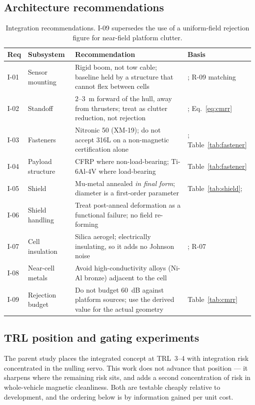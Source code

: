 \documentclass[11pt]{article}
\begin{document}
\subsection{Architecture recommendations}
\begin{table}[H]\centering\small
\begin{tabular}{p{1.0cm}p{3.2cm}p{7.2cm}p{4.0cm}}
\toprule
\textbf{Req}&\textbf{Subsystem}&\textbf{Recommendation}&\textbf{Basis}\\
\midrule
I-01&Sensor mounting&Rigid boom, not tow cable; baseline held by a structure that cannot flex between cells&\cite{seidel23sheet}; R-09 matching\\
I-02&Standoff&$2$--$3$~m forward of the hull, away from thrusters; treat as clutter reduction, not rejection&\cite{seidel2023}; Eq.~\eqref{eq:cmrr}\\
I-03&Fasteners&Nitronic 50 (XM-19); do not accept 316L on a non-magnetic certification alone&\cite{bssa,electralloy50}; Table~\ref{tab:fastener}\\
I-04&Payload structure&CFRP where non-load-bearing; Ti-6Al-4V where load-bearing&Table~\ref{tab:fastener}\\
I-05&Shield&Mu-metal annealed \emph{in final form}; diameter is a first-order parameter&Table~\ref{tab:shield}; \cite{gohil2020}\\
I-06&Shield handling&Treat post-anneal deformation as a functional failure; no field re-forming&\cite{gohil2020}\\
I-07&Cell insulation&Silica aerogel; electrically insulating, so it adds no Johnson noise&\cite{lee2008}; R-07\\
I-08&Near-cell metals&Avoid high-conductivity alloys (Ni-Al bronze) adjacent to the cell&\cite{lee2008}\\
I-09&Rejection budget&Do not budget $60$~dB against platform sources; use the derived value for the actual geometry&Table~\ref{tab:cmrr}\\
\bottomrule
\end{tabular}
\caption{Integration recommendations. I-09 supersedes the use of a uniform-field
rejection figure for near-field platform clutter.}\label{tab:integ}
\end{table}

\subsection{TRL position and gating experiments}
The parent study places the integrated concept at TRL~3--4 with integration risk
concentrated in the nulling servo. This work does not advance that position ---
it sharpens where the remaining risk sits, and adds a second concentration of
risk in whole-vehicle magnetic cleanliness. Both are testable cheaply relative
to development, and the ordering below is by information gained per unit cost.
\end{document}
